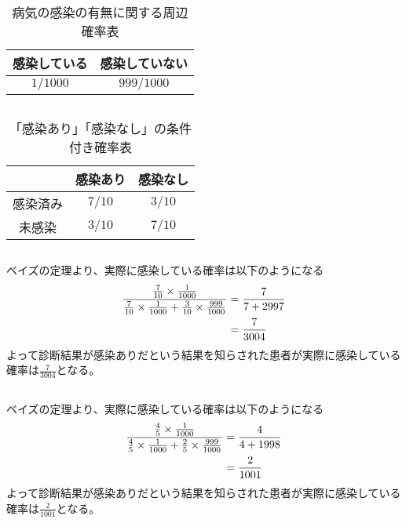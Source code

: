 \documentclass{jsarticle}
\begin{document}
    \subsection{}
    \begin{table}[H]
      \caption{病気の感染の有無に関する周辺確率表}
      \label{tab3}
      \centering
      \begin{tabular}{c|c}
        感染している & 感染していない \\ \hline
        $1 / 1000$ & $999 / 1000$ \\
      \end{tabular}
    \end{table}

    \subsection{}
    \begin{table}[H]
      \caption{「感染あり」「感染なし」の条件付き確率表}
      \label{tab4}
      \centering
      \begin{tabular}{c|c|c}
        & 感染あり & 感染なし \\ \hline
        感染済み & $7/10$ & $3/10$ \\ \hline
        未感染  & $3/10$ & $7/10$ \\
      \end{tabular}
    \end{table}

    \subsection{}
    ベイズの定理より、実際に感染している確率は以下のようになる
    \begin{align}
      \frac{\frac{7}{10} \times \frac{1}{1000}}{\frac{7}{10} \times \frac{1}{1000} + \frac{3}{10} \times \frac{999}{1000}}
      &= \frac{7}{7 + 2997} \notag \\
      &= \frac{7}{3004}
    \end{align}
    よって診断結果が感染ありだという結果を知らされた患者が実際に感染している確率は$\frac{7}{3004}$となる。

    \subsection{}
    ベイズの定理より、実際に感染している確率は以下のようになる
    \begin{align}
      \frac{\frac{4}{5} \times \frac{1}{1000}}{\frac{4}{5} \times \frac{1}{1000} + \frac{2}{5} \times \frac{999}{1000}}
      &= \frac{4}{4 + 1998} \notag \\
      &= \frac{2}{1001}
    \end{align}
    よって診断結果が感染ありだという結果を知らされた患者が実際に感染している確率は$\frac{2}{1001}$となる。
\end{document}
